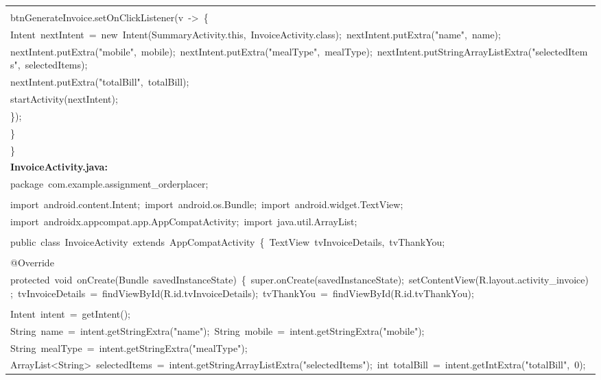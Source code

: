 \documentclass[a4paper,12pt]{article}
\begin{document}
\begin{longtable}{|p{}|}
\strut \\
{\ttfamily\small btnGenerateInvoice.setOnClickListener(v\ -\textgreater{}\ \{} \\
{\ttfamily\small Intent\ nextIntent\ =\ new\ Intent(SummaryActivity.this,\ InvoiceActivity.class);\ nextIntent.putExtra("name",\ name);} \\
{\ttfamily\small nextIntent.putExtra("mobile",\ mobile);\ nextIntent.putExtra("mealType",\ mealType);\ nextIntent.putStringArrayListExtra("selectedItems",\ selectedItems);} \\
{\ttfamily\small nextIntent.putExtra("totalBill",\ totalBill);} \\
{\ttfamily\small startActivity(nextIntent);} \\
{\ttfamily\small \});} \\
{\ttfamily\small \}} \\
{\ttfamily\small \}} \\
\hline
\rule{0pt}{13pt}\textbf{InvoiceActivity.java:} \\
\hline
{\ttfamily\small package\ com.example.assignment\_orderplacer;} \\
\strut \\
{\ttfamily\small import\ android.content.Intent;\ import\ android.os.Bundle;\ import\ android.widget.TextView;} \\
{\ttfamily\small import\ androidx.appcompat.app.AppCompatActivity;\ import\ java.util.ArrayList;} \\
\strut \\
{\ttfamily\small public\ class\ InvoiceActivity\ extends\ AppCompatActivity\ \{\ TextView\ tvInvoiceDetails,\ tvThankYou;} \\
\strut \\
{\ttfamily\small @Override} \\
{\ttfamily\small protected\ void\ onCreate(Bundle\ savedInstanceState)\ \{\ super.onCreate(savedInstanceState);\ setContentView(R.layout.activity\_invoice);\ tvInvoiceDetails\ =\ findViewById(R.id.tvInvoiceDetails);\ tvThankYou\ =\ findViewById(R.id.tvThankYou);} \\
\strut \\
{\ttfamily\small Intent\ intent\ =\ getIntent();} \\
{\ttfamily\small String\ name\ =\ intent.getStringExtra("name");\ String\ mobile\ =\ intent.getStringExtra("mobile");} \\
{\ttfamily\small String\ mealType\ =\ intent.getStringExtra("mealType");} \\
{\ttfamily\small ArrayList\textless{}String\textgreater{}\ selectedItems\ =\ intent.getStringArrayListExtra("selectedItems");\ int\ totalBill\ =\ intent.getIntExtra("totalBill",\ 0);} \\

\end{longtable}
\end{document}
